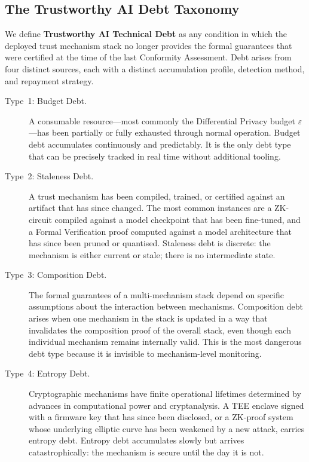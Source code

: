 \subsection{The Trustworthy AI Debt Taxonomy}
\label{subsec:debt-taxonomy}

We define \textbf{Trustworthy AI Technical Debt} as any
condition in which the deployed trust mechanism stack no longer
provides the formal guarantees that were certified at the time
of the last Conformity Assessment.
Debt arises from four distinct sources, each with a distinct
accumulation profile, detection method, and repayment strategy.

\begin{description}
  \item[Type~1: Budget Debt.]
    A consumable resource---most commonly the Differential
    Privacy budget $\varepsilon$---has been partially or fully
    exhausted through normal operation.
    Budget debt accumulates continuously and predictably.
    It is the only debt type that can be precisely tracked in
    real time without additional tooling.

  \item[Type~2: Staleness Debt.]
    A trust mechanism has been compiled, trained, or certified
    against an artifact that has since changed.
    The most common instances are a ZK-circuit compiled against
    a model checkpoint that has been fine-tuned, and a Formal
    Verification proof computed against a model architecture
    that has since been pruned or quantised.
    Staleness debt is discrete: the mechanism is either current
    or stale; there is no intermediate state.

  \item[Type~3: Composition Debt.]
    The formal guarantees of a multi-mechanism stack depend
    on specific assumptions about the interaction between
    mechanisms.
    Composition debt arises when one mechanism in the stack
    is updated in a way that invalidates the composition
    proof of the overall stack, even though each individual
    mechanism remains internally valid.
    This is the most dangerous debt type because it is
    invisible to mechanism-level monitoring.

  \item[Type~4: Entropy Debt.]
    Cryptographic mechanisms have finite operational lifetimes
    determined by advances in computational power and
    cryptanalysis.
    A TEE enclave signed with a firmware key that has since
    been disclosed, or a ZK-proof system whose underlying
    elliptic curve has been weakened by a new attack, carries
    entropy debt.
    Entropy debt accumulates slowly but arrives catastrophically:
    the mechanism is secure until the day it is not.
\end{description}

